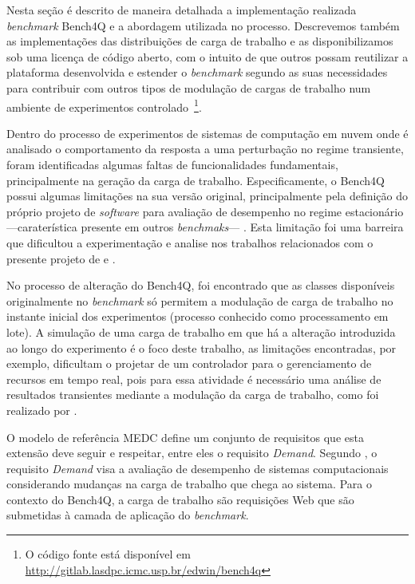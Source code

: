 Nesta seção é descrito de maneira detalhada a implementação realizada \textit{benchmark} Bench4Q e a abordagem utilizada no processo. Descrevemos também as implementações das distribuições de carga de trabalho e as disponibilizamos sob uma licença de código aberto, com o intuito de que outros possam reutilizar a plataforma desenvolvida e estender o \textit{benchmark} segundo as suas necessidades para contribuir com outros tipos de modulação de cargas de trabalho num ambiente de experimentos controlado~\footnote{O código fonte está disponível em \href{URL}{http://gitlab.lasdpc.icmc.usp.br/edwin/bench4q}}.

Dentro do processo de experimentos de sistemas de computação em nuvem onde é analisado o comportamento da resposta a uma perturbação no regime transiente, foram identificadas algumas faltas de funcionalidades fundamentais, principalmente na geração da carga de trabalho. Especificamente, o Bench4Q possui algumas limitações na sua versão original, principalmente pela definição do próprio projeto de \textit{software} para avaliação de desempenho no regime estacionário ---caraterística presente em outros \textit{benchmaks}--- . Esta limitação foi uma barreira que dificultou a experimentação e analise nos trabalhos relacionados com o presente projeto de  e .

No processo de alteração do Bench4Q, foi encontrado que as classes disponíveis originalmente no \textit{benchmark} só permitem a modulação de carga de trabalho no instante inicial dos experimentos (processo conhecido como processamento em lote). A simulação de uma carga de trabalho em que há a alteração introduzida ao longo do experimento é o foco deste trabalho, as limitações encontradas, por exemplo, dificultam o projetar de um controlador para o gerenciamento de recursos em tempo real, pois para essa atividade é necessário uma análise de resultados transientes mediante a modulação da carga de trabalho, como foi realizado por . 

O modelo de referência MEDC define um conjunto de requisitos que esta extensão deve seguir e respeitar, entre eles o requisito \textit{Demand}. Segundo , o requisito \textit{Demand} visa a avaliação de desempenho de sistemas computacionais considerando mudanças na carga de trabalho que chega ao sistema. Para o contexto do Bench4Q, a carga de trabalho são requisições Web que são submetidas à camada de aplicação do \textit{benchmark}. 

